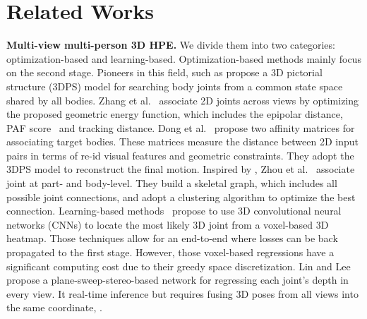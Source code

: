 \section{Related Works}

\noindent\textbf{Multi-view multi-person 3D HPE.} 
We divide them into two categories: optimization-based and learning-based. 
Optimization-based methods mainly focus on the second stage.
Pioneers in this field, such as \cite{belagiannis20143d,belagiannis2014multiple} propose a 3D pictorial structure (3DPS) model for searching  body joints from a common state space shared by all bodies. 
Zhang et al.~\cite{zhang20204d} associate 2D joints across views by optimizing the proposed geometric energy function, which includes the epipolar distance, PAF score~\cite{cao2019openpose} and tracking distance. 
Dong et al.~ \cite{dong2021fast} propose two affinity matrices for associating target bodies. These matrices measure the distance between 2D input pairs in terms of re-id visual features and geometric constraints. They adopt the 3DPS model to reconstruct the final motion. 
Inspired by \cite{zhang20204d,dong2021fast}, Zhou et al.~\cite{zhou2022quickpose} associate joint at part- and body-level. They build a skeletal graph, which includes all possible joint connections, and adopt a clustering algorithm to optimize the best connection.
Learning-based methods~\cite{tu2020voxelpose,reddy2021tessetrack} propose to use 3D convolutional neural networks (CNNs) to locate the most likely 3D joint from a voxel-based 3D heatmap. Those techniques allow for an end-to-end  where losses can be back propagated to the first stage. However, those voxel-based regressions have a significant computing cost due to their greedy space discretization.  Lin and Lee~\cite{lin2021multi} propose a plane-sweep-stereo-based network for regressing each joint's depth in every view. It  real-time inference but requires fusing 3D poses from all views into the same coordinate, . 
